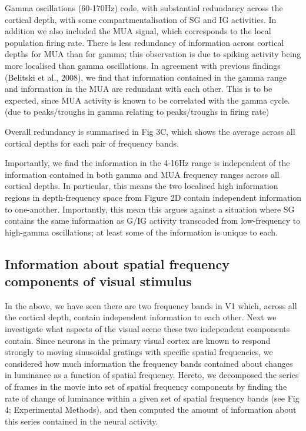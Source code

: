 Gamma oscillations (60-170Hz) code, with substantial redundancy across the cortical depth, with some compartmentalisation of SG and IG activities. In addition we also included the MUA signal, which corresponds to the local population firing rate. There is less redundancy of information across cortical depths for MUA than for gamma; this observation is due to spiking activity being more localised than gamma oscillations. In agreement with previous findings (Belitski et al., 2008), we find that information contained in the gamma range and information in the MUA are redundant with each other. This is to be expected, since MUA activity is known to be correlated with the gamma cycle.(due to peaks/troughs in gamma relating to peaks/troughs in firing rate)

Overall redundancy is summarised in Fig 3C, which shows the average across all cortical depths for each pair of frequency bands.

Importantly, we find the information in the 4-16Hz range is independent of the information contained in both gamma and MUA frequency ranges across all cortical depths. In particular, this means the two localised high information regions in depth-frequency space from Figure 2D contain independent information to one-another. Importantly, this mean this argues against a situation where SG contains the same information as G/IG activity transcoded from low-frequency to high-gamma oscillations; at least some of the information is unique to each.

\subsection{Information about spatial frequency components of visual stimulus}
In the above, we have seen there are two frequency bands in V1 which, across all the cortical depth, contain independent information to each other. Next we investigate what aspects of the visual scene these two independent components contain. Since neurons in the primary visual cortex are known to respond strongly to moving sinusoidal gratings with specific spatial frequencies, we considered how much information the frequency bands contained about changes in luminance as a function of spatial frequency. Hereto, we decomposed the series of frames in the movie into set of spatial frequency components by finding the rate of change of luminance within a given set of spatial frequency bands (see Fig 4; Experimental Methods), and then computed the amount of information about this series contained in the neural activity.

